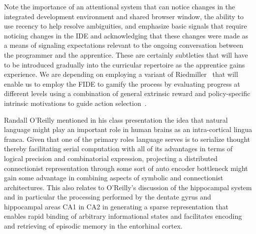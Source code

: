 Note the importance of an attentional system that can notice changes in the integrated development environment and shared browser window, the ability to use recency to help resolve ambiguities, and emphasize basic signals that require noticing changes in the IDE and acknowledging that these changes were made as a means of signaling expectations relevant to the ongoing conversation between the programmer and the apprentice. These are certainly subtleties that will have to be introduced gradually into the curricular repertoire as the apprentice gains experience. We are depending on employing a variant of Riedmiller~\etal{} that will enable us to employ the FIDE to gamify the process by evaluating progress at different levels using a combination of general extrinsic reward and policy-specific intrinsic motivations to guide action selection~\cite{RiedmilleretalCoRR-18}.

Randall O'Reilly mentioned in his class presentation the idea that natural language might play an important role in human brains as an intra-cortical lingua franca. Given that one of the primary roles language serves is to serialize thought thereby facilitating serial computation with all of its advantages in terms of logical precision and combinatorial expression, projecting a distributed connectionist representation through some sort of auto encoder bottleneck might gain some advantage in combining aspects of symbolic and connectionist architectures. This also relates to O'Reilly's discussion of the hippocampal system and in particular the processing performed by the dentate gyrus and hippocampal areas CA1 in CA2 in generating a sparse representation that enables rapid binding of arbitrary informational states and facilitates encoding and retrieving of episodic memory in the entorhinal cortex.\\

